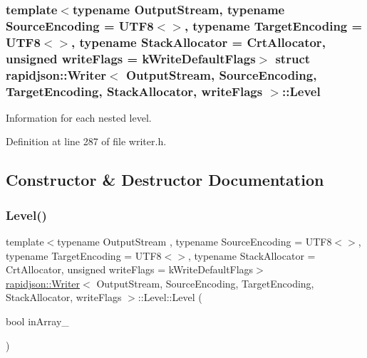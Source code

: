 \subsubsection*{template$<$typename Output\+Stream, typename Source\+Encoding = U\+T\+F8$<$$>$, typename Target\+Encoding = U\+T\+F8$<$$>$, typename Stack\+Allocator = Crt\+Allocator, unsigned write\+Flags = k\+Write\+Default\+Flags$>$\newline
struct rapidjson\+::\+Writer$<$ Output\+Stream, Source\+Encoding, Target\+Encoding, Stack\+Allocator, write\+Flags $>$\+::\+Level}

Information for each nested level. 

Definition at line 287 of file writer.\+h.



\subsection{Constructor \& Destructor Documentation}
\mbox{\label{structrapidjson_1_1_writer_1_1_level_aa12b98bd13c621e6a19cdb67d118f510}} 
\subsubsection{\texorpdfstring{Level()}{Level()}}
{\footnotesize\ttfamily template$<$typename Output\+Stream , typename Source\+Encoding  = U\+T\+F8$<$$>$, typename Target\+Encoding  = U\+T\+F8$<$$>$, typename Stack\+Allocator  = Crt\+Allocator, unsigned write\+Flags = k\+Write\+Default\+Flags$>$ \\
\mbox{\hyperlink{classrapidjson_1_1_writer}{rapidjson\+::\+Writer}}$<$ Output\+Stream, Source\+Encoding, Target\+Encoding, Stack\+Allocator, write\+Flags $>$\+::Level\+::\+Level (\begin{DoxyParamCaption}\item[{bool}]{in\+Array\+\_\+ }\end{DoxyParamCaption})}



